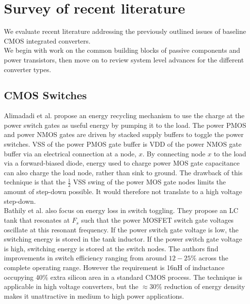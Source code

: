 \documentclass[letterpaper,twocolumn,10pt]{article}
\begin{document}
\section{Survey of recent literature} \label{litReview}
We evaluate recent literature addressing the previously outlined issues of baseline CMOS integrated converters.\\
We begin with work on the common building blocks of passive components and power transistors, then move on to review system level advances for the different converter types.\\ 
\subsection{CMOS Switches }Alimadadi et al.\cite{Alimadadi2008} propose an energy recycling mechanism to use the charge at the power switch gates as useful energy by pumping it to the load. The power PMOS and power NMOS gates are driven by stacked supply buffers to toggle the power switches. VSS of the power PMOS gate buffer is VDD of the power NMOS gate buffer via an electrical connection at a node, $x$. By connecting node $x$ to the load via a forward-biased diode, energy used to charge power MOS gate capacitance can also charge the load node, rather than sink to ground. The drawback of this technique is that the $\frac{1}{2}$ VSS swing of the power MOS gate nodes limits the amount of step-down possible. It would therefore not translate to a high voltage step-down.\\
\indent Bathily et al.\cite{Bathily2012} also focus on energy loss in switch toggling. They propose an LC tank that resonates at $F_s$ such that the power MOSFET switch gate voltages oscillate at this resonant frequency. If the power switch gate voltage is low, the switching energy is stored in the tank inductor. If the power switch gate voltage is high, switching energy is stored at the switch nodes. The authors find improvements in switch efficiency ranging from around $12 - 25\%$ across the complete operating range. However the requirement is 16nH of inductance occupying 40\% extra silicon area in a standard CMOS process. The technique is applicable in high voltage converters, but the $\approx$30\% reduction of energy density makes it unattractive in medium to high power applications.\\
\end{document}
